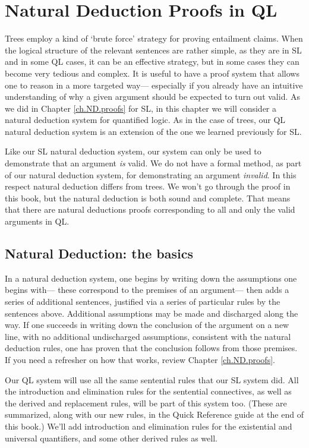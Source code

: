 \chapter{Natural Deduction Proofs in QL}
\label{ch.QLND}


Trees employ a kind of `brute force' strategy for proving entailment claims. When the logical structure of the relevant sentences are rather simple, as they are in SL and in some QL cases, it can be an effective strategy, but in some cases they can become very tedious and complex. It is useful to have a proof system that allows one to reason in a more targeted way--- especially if you already have an intuitive understanding of why a given argument should be expected to turn out valid. As we did in Chapter \ref{ch.ND.proofs} for SL, in this chapter we will consider a natural deduction system for quantified logic. As in the case of trees, our QL natural deduction system is an extension of the one we learned previously for SL.

Like our SL natural deduction system, our system can only be used to demonstrate that an argument \emph{is} valid. We do not have a formal method, as part of our natural deduction system, for demonstrating an argument \emph{invalid}. In this respect natural deduction differs from trees. We won't go through the proof in this book, but the natural deduction is both sound and complete. That means that there are natural deductions proofs corresponding to all and only the valid arguments in QL.

\section{Natural Deduction: the basics}

In a natural deduction system, one begins by writing down the assumptions one begins with--- these correspond to the premises of an argument--- then adds a series of additional sentences, justified via a series of particular rules by the sentences above. Additional assumptions may be made and discharged along the way. If one succeeds in writing down the conclusion of the argument on a new line, with no additional undischarged assumptions, consistent with the natural deduction rules, one has proven that the conclusion follows from those premises. If you need a refresher on how that works, review Chapter \ref{ch.ND.proofs}.

Our QL system will use all the same sentential rules that our SL system did. All the introduction and elimination rules for the sentential connectives, as well as the derived and replacement rules, will be part of this system too. (These are summarized, along with our new rules, in the Quick Reference guide at the end of this book.) We'll add introduction and elimination rules for the existential and universal quantifiers, and some other derived rules as well.

